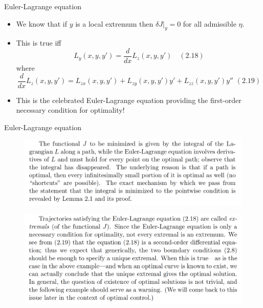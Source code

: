 \documentclass{beamer}
\begin{document}
\begin{frame}{Euler-Lagrange equation}
\begin{itemize}
    \item We know that if $y$ is a local extremum then $\delta J\vert_y=0$ for all admissible $\eta$.
    \item This is true iff
    \begin{equation*}
        L_y(x, y, y') = \frac{d}{dx}L_z(x, y, y')   \quad (2.18)
    \end{equation*}
    where
    \begin{equation*}
        \frac{d}{dx}L_z(x, y, y') = L_{zx}(x, y, y') + L_{zy}(x, y, y')y' + L_{zz}(x, y, y')y'' \,\, (2.19)
    \end{equation*}
    \item This is the celebrated Euler-Lagrange equation providing the first-order necessary condition for optimality!
\end{itemize}
\end{frame}

\begin{frame}{Euler-Lagrange equation}
    \begin{figure}
        \centering
        \includegraphics[width=\linewidth]{ch2/fig11.png}
    \end{figure}

    \begin{figure}
        \centering
        \includegraphics[width=\linewidth]{ch2/fig12.png}
    \end{figure}
\end{frame}
\end{document}

